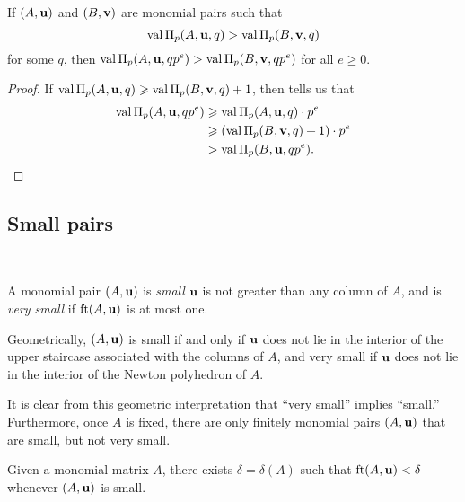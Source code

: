 \documentclass[11pt]{amsart}
\begin{document}
\begin{corollary}
   \label{cor: mu comparison}
   If $(A, \mathbf{u})$ and $(B, \mathbf{v})$ are monomial pairs such that
   \[ \operatorname{val} \Pi_p(A, \mathbf{u}, q) > \operatorname{val} \Pi_p(B, \mathbf{v}, q)\]
   for some $q$, then $\operatorname{val} \Pi_p(A, \mathbf{u}, qp^e) > \operatorname{val} \Pi_p(B, \mathbf{v}, qp^e)$ for all $e \geq 0$.
\end{corollary}

\begin{proof}
   If $\operatorname{val} \Pi_p(A, \mathbf{u}, q) \geqslant \operatorname{val} \Pi_p(B, \mathbf{v}, q) + 1$, then  tells us that
   \begin{align*}
     \operatorname{val} \Pi_p(A, \mathbf{u}, qp^e)  &\geqslant \operatorname{val} \Pi_p(A, \mathbf{u}, q) \cdot p^e \\
                                  &\geqslant (\operatorname{val} \Pi_p(B, \mathbf{v}, q)+1)\cdot p^e \\
                                  & > \operatorname{val} \Pi_p(B, \mathbf{u}, qp^e). \qedhere
   \end{align*}
\end{proof}

\subsection{Small pairs}

\ 

\begin{definition}
A monomial pair $(A, \mathbf{u})$ is \emph{small} $\mathbf{u}$ is not greater than any column of $A$, and is \emph{very small} if $\operatorname{ft}(A, \mathbf{u})$ is at most one.
\end{definition}

\begin{remark}
\label{finitely many small but not very small: R}
Geometrically, $(A, \mathbf{u})$ is small if and only if $\mathbf{u}$ does not lie in the interior of the upper staircase associated with the columns of $A$, and very small if $\mathbf{u}$ does not lie in the interior of the Newton polyhedron of $A$.  

It is clear from this geometric interpretation that ``very small'' implies ``small.''  Furthermore, once $A$ is fixed, there are only finitely monomial pairs $(A, \mathbf{u})$ that are small, but not very small. 
\end{remark}

\begin{lemma}
\label{refined-discreteness: L}
Given a monomial matrix $A$, there exists $\delta = \delta(A)$ such that $\operatorname{ft}(A, \mathbf{u}) < \delta$ whenever $(A, \mathbf{u})$ is small.
\end{lemma}
\end{document}
